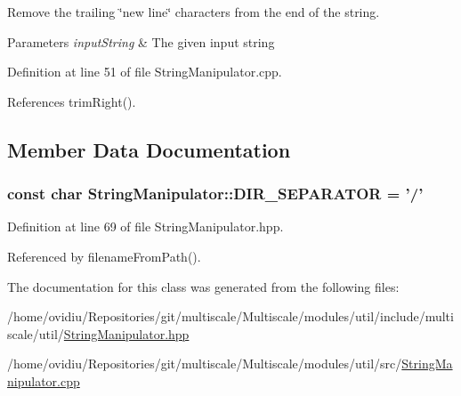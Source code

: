 Remove the trailing \char`\"{}new line\char`\"{} characters from the end of the string. 


\begin{DoxyParams}{Parameters}
{\em input\-String} & The given input string \\
\hline
\end{DoxyParams}


Definition at line 51 of file String\-Manipulator.\-cpp.



References trim\-Right().



\subsection{Member Data Documentation}
\hypertarget{classmultiscale_1_1StringManipulator_a3c975968005d8db010415d240b02b5db}{
\subsubsection[{D\-I\-R\-\_\-\-S\-E\-P\-A\-R\-A\-T\-O\-R}]{\setlength{\rightskip}{0pt plus 5cm}const char String\-Manipulator\-::\-D\-I\-R\-\_\-\-S\-E\-P\-A\-R\-A\-T\-O\-R = '/'\hspace{0.3cm}{\ttfamily [static]}}}\label{classmultiscale_1_1StringManipulator_a3c975968005d8db010415d240b02b5db}


Definition at line 69 of file String\-Manipulator.\-hpp.



Referenced by filename\-From\-Path().



The documentation for this class was generated from the following files\-:\begin{DoxyCompactItemize}
\item 
/home/ovidiu/\-Repositories/git/multiscale/\-Multiscale/modules/util/include/multiscale/util/\hyperlink{StringManipulator_8hpp}{String\-Manipulator.\-hpp}\item 
/home/ovidiu/\-Repositories/git/multiscale/\-Multiscale/modules/util/src/\hyperlink{StringManipulator_8cpp}{String\-Manipulator.\-cpp}\end{DoxyCompactItemize}
